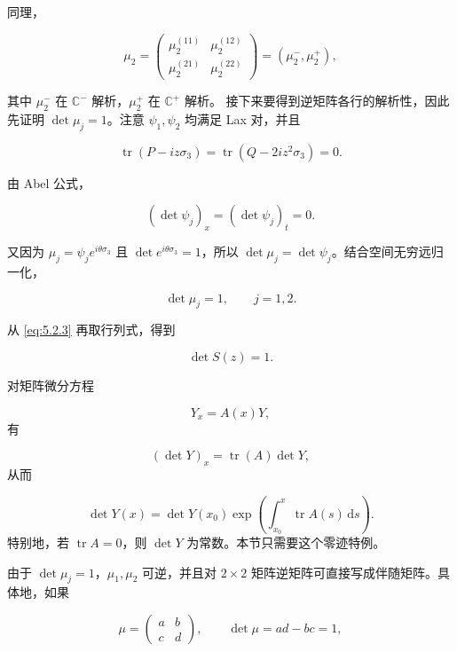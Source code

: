 \documentclass[
    lang=cn,
    scheme=chinese,
    mode=simple,
    device=normal,
    color=blue,
    math=cm,
    thmcnt=section,
    12pt
]{elegantbook}
\begin{document}
同理，

\begin{equation}
    \mu_2
    =
    \begin{pmatrix}
        \mu_2^{(11)} & \mu_2^{(12)} \\
        \mu_2^{(21)} & \mu_2^{(22)}
    \end{pmatrix}
    =
    (\mu_2^-,\mu_2^+),
    \tag{5.2.19}
    \label{eq:5.2.19}
\end{equation}

其中 $\mu_2^-$ 在 $\mathbb{C}^-$ 解析，$\mu_2^+$ 在 $\mathbb{C}^+$ 解析。
接下来要得到逆矩阵各行的解析性，因此先证明 $\det\mu_j=1$。注意 $\psi_1,\psi_2$ 均满足 Lax 对，并且

\[
    \operatorname{tr}(P-iz\sigma_3)
    =
    \operatorname{tr}(Q-2iz^2\sigma_3)
    =
    0.
\]

由 Abel 公式，

\begin{equation}
    (\det\psi_j)_x
    =
    (\det\psi_j)_t
    =
    0.
    \tag{5.2.20}
    \label{eq:5.2.20}
\end{equation}

又因为 $\mu_j=\psi_je^{i\theta\sigma_3}$ 且 $\det e^{i\theta\sigma_3}=1$，所以 $\det\mu_j=\det\psi_j$。结合空间无穷远归一化，

\begin{equation}
    \det\mu_j=1,\qquad j=1,2.
    \tag{5.2.21}
    \label{eq:5.2.21}
\end{equation}

从 \eqref{eq:5.2.3} 再取行列式，得到

\[
    \det S(z)=1.
\]

\begin{callout}
    对矩阵微分方程

    \[
        Y_x=A(x)Y,
    \]
    有

    \[
        (\det Y)_x=\operatorname{tr}(A)\det Y,
    \]
    从而

    \[
        \det Y(x)
        =
        \det Y(x_0)
        \exp\!\left(\int_{x_0}^{x}\operatorname{tr}A(s)\,\mathrm ds\right).
    \]
    特别地，若 $\operatorname{tr}A=0$，则 $\det Y$ 为常数。本节只需要这个零迹特例。
\end{callout}

由于 $\det\mu_j=1$，$\mu_1,\mu_2$ 可逆，并且对 $2\times2$ 矩阵逆矩阵可直接写成伴随矩阵。具体地，如果

\[
    \mu=
    \begin{pmatrix}
        a & b \\
        c & d
    \end{pmatrix},
    \qquad
    \det\mu=ad-bc=1,
\]
\end{document}

